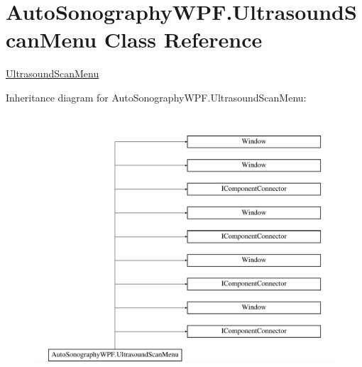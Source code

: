 \hypertarget{class_auto_sonography_w_p_f_1_1_ultrasound_scan_menu}{}\section{Auto\+Sonography\+W\+P\+F.\+Ultrasound\+Scan\+Menu Class Reference}
\label{class_auto_sonography_w_p_f_1_1_ultrasound_scan_menu}


\hyperlink{class_auto_sonography_w_p_f_1_1_ultrasound_scan_menu}{Ultrasound\+Scan\+Menu}  


Inheritance diagram for Auto\+Sonography\+W\+P\+F.\+Ultrasound\+Scan\+Menu\+:\begin{figure}[H]
\begin{center}
\leavevmode
\includegraphics[height=10.000000cm]{class_auto_sonography_w_p_f_1_1_ultrasound_scan_menu}
\end{center}
\end{figure}
